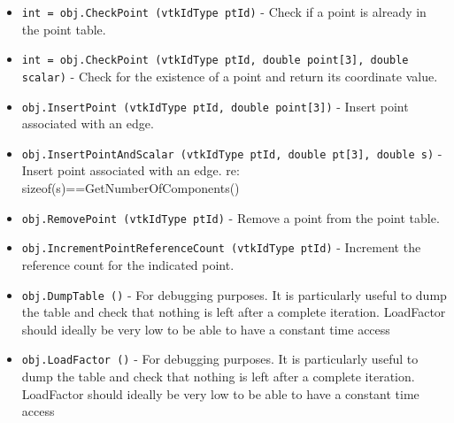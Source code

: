 \begin{itemize}
\item  \verb|int = obj.CheckPoint (vtkIdType ptId)| -  Check if a point is already in the point table.

\item  \verb|int = obj.CheckPoint (vtkIdType ptId, double point[3], double scalar)| -  Check for the existence of a point and return its coordinate value.
 

\item  \verb|obj.InsertPoint (vtkIdType ptId, double point[3])| -  Insert point associated with an edge.

\item  \verb|obj.InsertPointAndScalar (vtkIdType ptId, double pt[3], double s)| -  Insert point associated with an edge.
 re: sizeof(s)==GetNumberOfComponents()

\item  \verb|obj.RemovePoint (vtkIdType ptId)| -  Remove a point from the point table.

\item  \verb|obj.IncrementPointReferenceCount (vtkIdType ptId)| -  Increment the reference count for the indicated point.

\item  \verb|obj.DumpTable ()| -  For debugging purposes. It is particularly useful to dump the table
 and check that nothing is left after a complete iteration. LoadFactor
 should ideally be very low to be able to have a constant time access

\item  \verb|obj.LoadFactor ()| -  For debugging purposes. It is particularly useful to dump the table
 and check that nothing is left after a complete iteration. LoadFactor
 should ideally be very low to be able to have a constant time access

\end{itemize}
